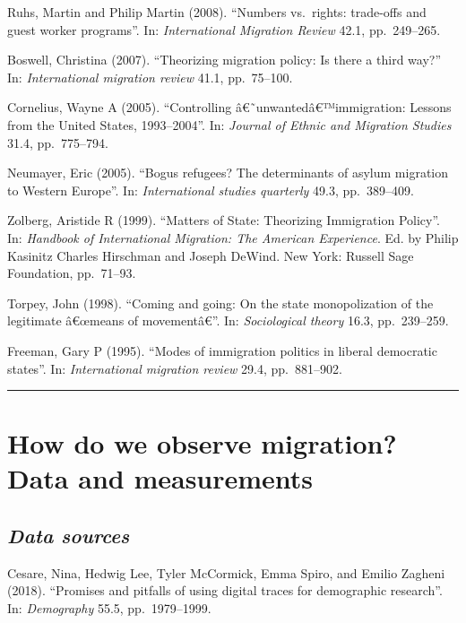 \documentclass[
  12pt,
]{article}
\begin{document}
Ruhs, Martin and Philip Martin (2008). ``Numbers vs.~rights: trade-offs
and guest worker programs''. In: \emph{International Migration Review}
42.1, pp.~249--265.

Boswell, Christina (2007). ``Theorizing migration policy: Is there a
third way?'' In: \emph{International migration review} 41.1,
pp.~75--100.

Cornelius, Wayne A (2005). ``Controlling â€˜unwantedâ€™immigration:
Lessons from the United States, 1993--2004''. In:
\emph{Journal of Ethnic and Migration Studies} 31.4, pp.~775--794.

Neumayer, Eric (2005). ``Bogus refugees? The determinants of asylum
migration to Western Europe''. In:
\emph{International studies quarterly} 49.3, pp.~389--409.

Zolberg, Aristide R (1999). ``Matters of State: Theorizing Immigration
Policy''. In:
\emph{Handbook of International Migration: The American Experience}. Ed.
by Philip Kasinitz Charles Hirschman and Joseph DeWind. New York:
Russell Sage Foundation, pp.~71--93.

Torpey, John (1998). ``Coming and going: On the state monopolization of
the legitimate â€œmeans of movementâ€''. In: \emph{Sociological theory}
16.3, pp.~239--259.

Freeman, Gary P (1995). ``Modes of immigration politics in liberal
democratic states''. In: \emph{International migration review} 29.4,
pp.~881--902.

\begin{center}\rule{0.5\linewidth}{0.5pt}\end{center}

\hypertarget{how-do-we-observe-migration-data-and-measurements}{%
\section{\texorpdfstring{\textbf{How do we observe migration? Data and
measurements}}{How do we observe migration? Data and measurements}}\label{how-do-we-observe-migration-data-and-measurements}}

\hypertarget{data-sources}{%
\subsection{\texorpdfstring{\emph{Data
sources}}{Data sources}}\label{data-sources}}

Cesare, Nina, Hedwig Lee, Tyler McCormick, Emma Spiro, and Emilio
Zagheni (2018). ``Promises and pitfalls of using digital traces for
demographic research''. In: \emph{Demography} 55.5, pp.~1979--1999.
\end{document}
